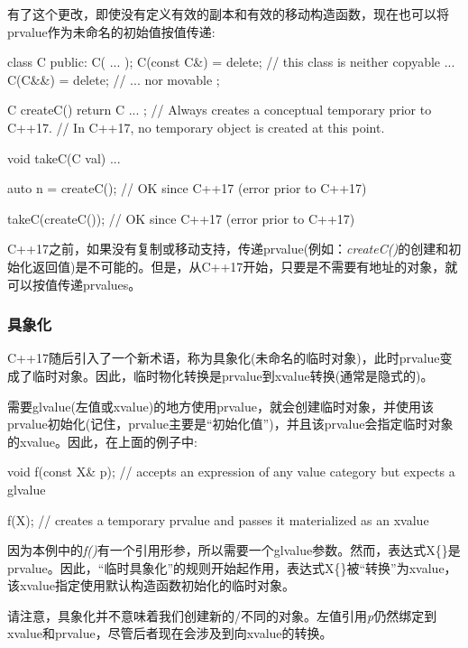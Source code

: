 有了这个更改，即使没有定义有效的副本和有效的移动构造函数，现在也可以将prvalue作为未命名的初始值按值传递:

\begin{cppcode}
class C {
	public:
	C( ... );
	C(const C&) = delete; // this class is neither copyable ...
	C(C&&) = delete; // ... nor movable
};

C createC() {
	return C{ ... }; // Always creates a conceptual temporary prior to C++17.
} // In C++17, no temporary object is created at this point.

void takeC(C val) {
	...
}

auto n = createC(); // OK since C++17 (error prior to C++17)

takeC(createC()); // OK since C++17 (error prior to C++17)
\end{cppcode}

C++17之前，如果没有复制或移动支持，传递prvalue(例如：\textit{createC()}的创建和初始化返回值)是不可能的。但是，从C++17开始，只要是不需要有地址的对象，就可以按值传递prvalues。

\subsubsection{具象化}

C++17随后引入了一个新术语，称为具象化(未命名的临时对象)，此时prvalue变成了临时对象。因此，临时物化转换是prvalue到xvalue转换(通常是隐式的)。

需要glvalue(左值或xvalue)的地方使用prvalue，就会创建临时对象，并使用该prvalue初始化(记住，prvalue主要是“初始化值”)，并且该prvalue会指定临时对象的xvalue。因此，在上面的例子中:

\begin{cppcode}
void f(const X& p); // accepts an expression of any value category but expects a glvalue

f(X{}); // creates a temporary prvalue and passes it materialized as an xvalue
\end{cppcode}

因为本例中的\textit{f()}有一个引用形参，所以需要一个glvalue参数。然而，表达式X\{\}是prvalue。因此，“临时具象化”的规则开始起作用，表达式X\{\}被“转换”为xvalue，该xvalue指定使用默认构造函数初始化的临时对象。

请注意，具象化并不意味着我们创建新的/不同的对象。左值引用\textit{p}仍然绑定到xvalue和prvalue，尽管后者现在会涉及到向xvalue的转换。






